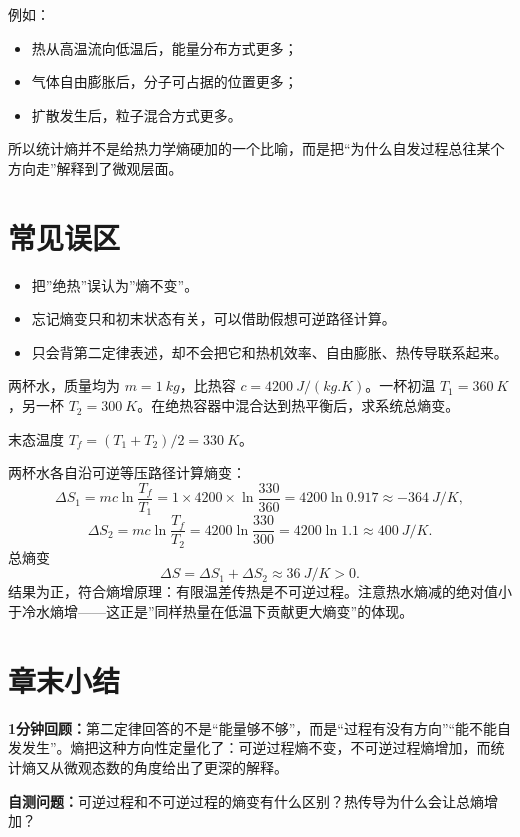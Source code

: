 \documentclass[lang=cn,11pt]{elegantbook}
\newcommand{\summaryline}[1]{\par\noindent\textbf{1分钟回顾：}#1\par}
\newcommand{\chapterselfcheck}[1]{\par\noindent\textbf{自测问题：}#1\par}
\begin{document}
例如：
\begin{itemize}
  \item 热从高温流向低温后，能量分布方式更多；
  \item 气体自由膨胀后，分子可占据的位置更多；
  \item 扩散发生后，粒子混合方式更多。
\end{itemize}

所以统计熵并不是给热力学熵硬加的一个比喻，而是把“为什么自发过程总往某个方向走”解释到了微观层面。

\section{常见误区}

\begin{itemize}
  \item 把”绝热”误认为”熵不变”。
  \item 忘记熵变只和初末状态有关，可以借助假想可逆路径计算。
  \item 只会背第二定律表述，却不会把它和热机效率、自由膨胀、热传导联系起来。
\end{itemize}

\begin{example}
两杯水，质量均为 \(m=\SI{1}{kg}\)，比热容 \(c=\SI{4200}{J/(kg.K)}\)。一杯初温 \(T_1=\SI{360}{K}\)，另一杯 \(T_2=\SI{300}{K}\)。在绝热容器中混合达到热平衡后，求系统总熵变。
\end{example}
\begin{solution}
末态温度 \(T_f=(T_1+T_2)/2=\SI{330}{K}\)。

两杯水各自沿可逆等压路径计算熵变：
\[
\Delta S_1=mc\ln\frac{T_f}{T_1}=1\times4200\times\ln\frac{330}{360}=4200\ln0.917\approx\SI{-364}{J/K},
\]
\[
\Delta S_2=mc\ln\frac{T_f}{T_2}=4200\ln\frac{330}{300}=4200\ln1.1\approx\SI{+400}{J/K}.
\]
总熵变
\[
\Delta S=\Delta S_1+\Delta S_2\approx\SI{+36}{J/K}>0.
\]
结果为正，符合熵增原理：有限温差传热是不可逆过程。注意热水熵减的绝对值小于冷水熵增——这正是”同样热量在低温下贡献更大熵变”的体现。
\end{solution}

\section{章末小结}

\summaryline{第二定律回答的不是“能量够不够”，而是“过程有没有方向”“能不能自发发生”。熵把这种方向性定量化了：可逆过程熵不变，不可逆过程熵增加，而统计熵又从微观态数的角度给出了更深的解释。}
\chapterselfcheck{可逆过程和不可逆过程的熵变有什么区别？热传导为什么会让总熵增加？}
\end{document}
